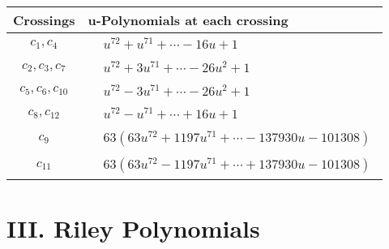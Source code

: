 \documentclass[1p]{elsarticle_modified}
\theoremstyle{definition}
\begin{document}
\begin{tabular}{m{50pt}|m{274pt}}
Crossings & \hspace{64pt}u-Polynomials at each crossing \\
\hline $$\begin{aligned}c_{1},c_{4}\end{aligned}$$&$\begin{aligned}
&u^{72}+u^{71}+\cdots-16 u+1
\end{aligned}$\\
\hline $$\begin{aligned}c_{2},c_{3},c_{7}\end{aligned}$$&$\begin{aligned}
&u^{72}+3 u^{71}+\cdots-26 u^2+1
\end{aligned}$\\
\hline $$\begin{aligned}c_{5},c_{6},c_{10}\end{aligned}$$&$\begin{aligned}
&u^{72}-3 u^{71}+\cdots-26 u^2+1
\end{aligned}$\\
\hline $$\begin{aligned}c_{8},c_{12}\end{aligned}$$&$\begin{aligned}
&u^{72}- u^{71}+\cdots+16 u+1
\end{aligned}$\\
\hline $$\begin{aligned}c_{9}\end{aligned}$$&$\begin{aligned}
&63(63 u^{72}+1197 u^{71}+\cdots-137930 u-101308)
\end{aligned}$\\
\hline $$\begin{aligned}c_{11}\end{aligned}$$&$\begin{aligned}
&63(63 u^{72}-1197 u^{71}+\cdots+137930 u-101308)
\end{aligned}$\\
\hline
\end{tabular}\newpage\renewcommand{\arraystretch}{1}
\centering \section*{ III. Riley Polynomials}
\end{document}

